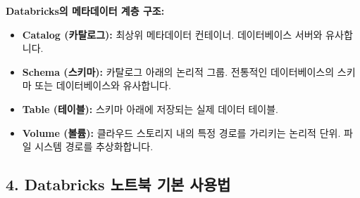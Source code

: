 \documentclass[11pt,a4paper]{article}
\begin{document}
\begin{notebox}
\textbf{Databricks의 메타데이터 계층 구조:}
\begin{itemize}
    \item \textbf{Catalog (카탈로그):} 최상위 메타데이터 컨테이너. 데이터베이스 서버와 유사합니다.
    \item \textbf{Schema (스키마):} 카탈로그 아래의 논리적 그룹. 전통적인 데이터베이스의 스키마 또는 데이터베이스와 유사합니다.
    \item \textbf{Table (테이블):} 스키마 아래에 저장되는 실제 데이터 테이블.
    \item \textbf{Volume (볼륨):} 클라우드 스토리지 내의 특정 경로를 가리키는 논리적 단위. 파일 시스템 경로를 추상화합니다.
\end{itemize}
\end{notebox}

\subsection*{4. Databricks 노트북 기본 사용법}
\end{document}
